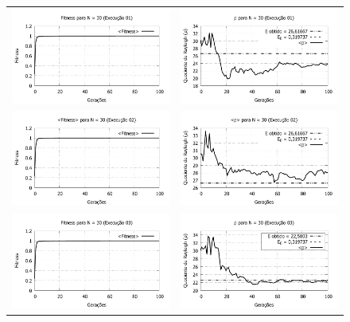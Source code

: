 \begin{figure}[phtb]
\centering
  \begin{tabular}{@{}cc@{}}
    \includegraphics[width=.40\textwidth]{figs/resultados/N30_01_fitness.pdf} &
    \includegraphics[width=.40\textwidth]{figs/resultados/N30_01_rho.pdf}   \\
		\includegraphics[width=.40\textwidth]{figs/resultados/N30_02_fitness.pdf} &
    \includegraphics[width=.40\textwidth]{figs/resultados/N30_02_rho.pdf}   \\
		\includegraphics[width=.40\textwidth]{figs/resultados/N30_03_fitness.pdf} &
    \includegraphics[width=.40\textwidth]{figs/resultados/N30_03_rho.pdf}   \\

\end{tabular}
\end{figure}
